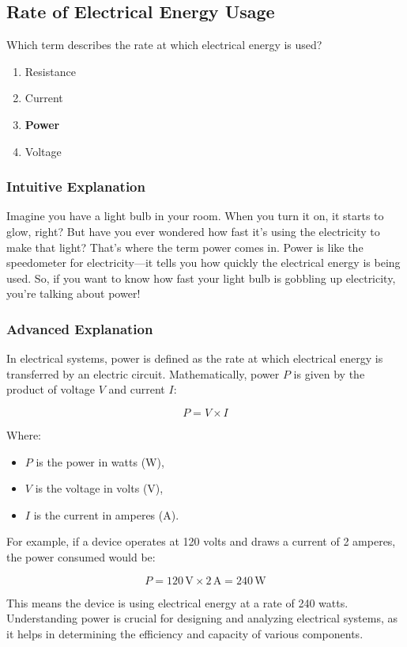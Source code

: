 \subsection{Rate of Electrical Energy Usage}
\label{T5A10}

\begin{tcolorbox}[colback=gray!10!white,colframe=black!75!black,title=T5A10]
Which term describes the rate at which electrical energy is used?
\begin{enumerate}[label=\Alph*)]
    \item Resistance
    \item Current
    \item \textbf{Power}
    \item Voltage
\end{enumerate}
\end{tcolorbox}

\subsubsection{Intuitive Explanation}
Imagine you have a light bulb in your room. When you turn it on, it starts to glow, right? But have you ever wondered how fast it's using the electricity to make that light? That's where the term power comes in. Power is like the speedometer for electricity—it tells you how quickly the electrical energy is being used. So, if you want to know how fast your light bulb is gobbling up electricity, you're talking about power!

\subsubsection{Advanced Explanation}
In electrical systems, power is defined as the rate at which electrical energy is transferred by an electric circuit. Mathematically, power \( P \) is given by the product of voltage \( V \) and current \( I \):

\[
P = V \times I
\]

Where:
\begin{itemize}
    \item \( P \) is the power in watts (W),
    \item \( V \) is the voltage in volts (V),
    \item \( I \) is the current in amperes (A).
\end{itemize}

For example, if a device operates at 120 volts and draws a current of 2 amperes, the power consumed would be:

\[
P = 120 \, \text{V} \times 2 \, \text{A} = 240 \, \text{W}
\]

This means the device is using electrical energy at a rate of 240 watts. Understanding power is crucial for designing and analyzing electrical systems, as it helps in determining the efficiency and capacity of various components.

